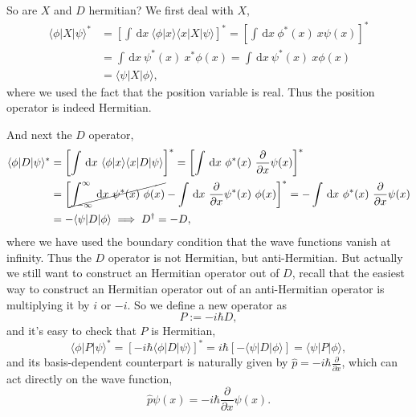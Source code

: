 \documentclass{article}
\newcommand{\be}{\begin{equation}}
\newcommand{\ee}{\end{equation}}
\newcommand{\dif}{\,\mathrm{d}}
\newcommand{\p}{\partial}
\newcommand{\1}{\left}
\newcommand{\2}{\right}
\newcommand{\la}{\langle}
\newcommand{\ra}{\rangle}
\begin{document}
So are $X$ and $D$ hermitian? We first deal with $X$,
\be\begin{split}
\la\phi|X|\psi\ra^*&=\1[\int\dif x\ \la\phi|x\ra\la x|X|\psi\ra\2]^*=\1[\int\dif x\ \phi^*(x)\ x \psi(x)\2]^*\\
&=\int\dif x\ \psi^*(x)\ x^* \phi(x)=\int\dif x\ \psi^*(x)\ x \phi(x)\\
&=\la\psi|X|\phi\ra,
\end{split}\ee
where we used the fact that the position variable is real. Thus the position operator is indeed Hermitian.

And next the $D$ operator,
\be\begin{split}
\la\phi|D|\psi\ra^*&=\1[\int\dif x\ \la\phi|x\ra\la x|D|\psi\ra\2]^*=\1[\int\dif x\ \phi^*(x)\  \frac\p{\p x}\psi(x)\2]^*\\
&=\1[\cancel{\int_{-\infty}^{\infty} \dif x\ \psi^*(x)\ \phi(x)}-\int\dif x\ \frac\p{\p x}\psi^*(x)\ \phi(x)\2]^*=-\int\dif x\ \phi^*(x)\  \frac\p{\p x}\psi(x)\\
&=-\la\psi|D|\phi\ra \implies D^\dagger=-D,
\end{split}\ee
where we have used the boundary condition that the wave functions vanish at infinity. Thus the $D$ operator is not Hermitian, but anti-Hermitian. But actually we still want to construct an Hermitian operator out of $D$, recall that the easiest way to construct an Hermitian operator out of an anti-Hermitian operator is multiplying it by $i$ or $-i$. So we define a new operator as
\be
P:=-i\hbar D,
\ee
and it's easy to check that $P$ is Hermitian,
\be
\la\phi|P|\psi\ra^*=[-i\hbar\la\phi|D|\psi\ra]^*=i\hbar[-\la\psi|D|\phi\ra]=\la\psi|P|\phi\ra,
\ee
and its basis-dependent counterpart is naturally given by $\hat p=-i\hbar\frac\p{\p x}$, which can act directly on the wave function,
\be
\hat p\psi(x)=-i\hbar\frac\p{\p x}\psi(x).
\ee\\
\end{document}
